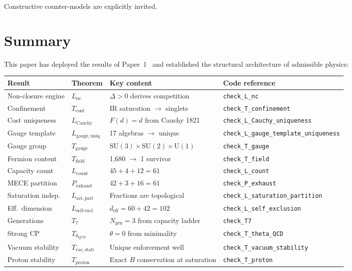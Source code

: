 \documentclass[11pt]{article}
\newcommand{\SU}{\mathrm{SU}}
\newcommand{\U}{\mathrm{U}}
\begin{document}
Constructive counter-models are explicitly invited.


\section{Summary}
\label{sec:summary}

This paper has deployed the results of Paper~1~\cite{BrookePaper1} and established the structural architecture of admissible physics:

\begin{center}
\footnotesize
\begin{tabular}{lp{2.8cm}p{4.2cm}l}
\toprule
\textbf{Result} & \textbf{Theorem} & \textbf{Key content} & \textbf{Code reference} \\
\midrule
Non-closure engine & $L_{\mathrm{nc}}$ & $\Delta > 0$ derives competition & \texttt{check\_L\_nc} \\
Confinement & $T_{\mathrm{conf}}$ & IR saturation $\to$ singlets & \texttt{check\_T\_confinement} \\
Cost uniqueness & $L_{\mathrm{Cauchy}}$ & $F(d) = d$ from Cauchy 1821 & \texttt{check\_L\_Cauchy\_uniqueness} \\
Gauge template & $L_{\mathrm{gauge,uniq}}$ & 17 algebras $\to$ unique & \texttt{check\_L\_gauge\_template\_uniqueness} \\
Gauge group & $T_{\mathrm{gauge}}$ & $\SU(3) \!\times\! \SU(2) \!\times\! \U(1)$ & \texttt{check\_T\_gauge} \\
Fermion content & $T_{\mathrm{field}}$ & 1{,}680 $\to$ 1 survivor & \texttt{check\_T\_field} \\
Capacity count & $L_{\mathrm{count}}$ & $45 + 4 + 12 = 61$ & \texttt{check\_L\_count} \\
MECE partition & $P_{\mathrm{exhaust}}$ & $42 + 3 + 16 = 61$ & \texttt{check\_P\_exhaust} \\
Saturation indep. & $L_{\mathrm{sat,part}}$ & Fractions are topological & \texttt{check\_L\_saturation\_partition} \\
Eff.\ dimension & $L_{\mathrm{self\text{-}excl}}$ & $d_{\mathrm{eff}} = 60 + 42 = 102$ & \texttt{check\_L\_self\_exclusion} \\
Generations & $T_7$ & $N_{\mathrm{gen}} = 3$ from capacity ladder & \texttt{check\_T7} \\
Strong CP & $T_{\theta_{\mathrm{QCD}}}$ & $\theta = 0$ from minimality & \texttt{check\_T\_theta\_QCD} \\
Vacuum stability & $T_{\mathrm{vac,stab}}$ & Unique enforcement well & \texttt{check\_T\_vacuum\_stability} \\
Proton stability & $T_{\mathrm{proton}}$ & Exact $B$ conservation at saturation & \texttt{check\_T\_proton} \\
\bottomrule
\end{tabular}
\end{center}
\end{document}

